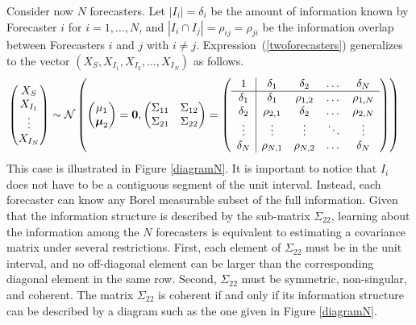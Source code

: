 \documentclass[11pt]{article}
\theoremstyle{definition}
\theoremstyle{definition}
\begin{document}
Consider now $N$ forecasters. Let $|I_i| = \delta_i$ be the amount of 
information known by Forecaster $i$ for $i = 1, \dots, N$, and 
$|I_i \cap I_j| = \rho_{ij} = \rho_{ji}$ be the information overlap 
between Forecasters $i$ and $j$ with $i \neq j$. 
Expression~(\ref{twoforecasters}) generalizes to the vector 
$\left(X_{S}, X_{I_1}, X_{I_2}, \dots, X_{I_N}\right)$ as follows.
\begin{align}
\left(\begin{matrix} X_S \\ X_{I_1}\\ \vdots \\ X_{I_N} \end{matrix}\right) &\sim \mathcal{N}\left( \left(\begin{matrix} 
\mu_1 \\ \boldsymbol{\mu}_2
 \end{matrix}\right) =
 \boldsymbol{0}, \left(\begin{matrix} 
\Sigma_{11} & \Sigma_{12}\\
\Sigma_{21} & \Sigma_{22}\\
 \end{matrix}\right) 
 =
 \left(\begin{array}{c | c c cc }
1 & \delta_1 & \delta_2 & \dots & \delta_N  \\ \hline
\delta_1 & \delta_1 &\rho_{1,2} & \dots & \rho_{1,N}   \\ 
\delta_2 & \rho_{2,1} & \delta_2 & \dots & \rho_{2,N}  \\ 
\vdots & \vdots & \vdots & \ddots & \vdots  \\ 
\delta_N & \rho_{N,1} & \rho_{N,2} & \dots & \delta_N\\ 
 \end{array}\right)\right)  \label{Nforecasters}
\end{align}
This case is illustrated in Figure \ref{diagramN}.  It is important 
to notice that $I_i$ does not have to be a contiguous segment of 
the unit interval.  Instead, each forecaster can know any Borel measurable 
subset of the full information.  Given that the information structure 
is described by the sub-matrix $\Sigma_{22}$, learning about the 
information among the $N$ forecasters is equivalent to estimating 
a covariance matrix under several restrictions.  First, each element 
of $\Sigma_{22}$ must be in the unit interval, and no off-diagonal 
element can be larger than the corresponding diagonal element in 
the same row. Second, $\Sigma_{22}$ must be symmetric, non-singular, 
and coherent. The matrix $\Sigma_{22}$ is coherent if and only if 
its information structure can be described by a diagram such as 
the one given in Figure \ref{diagramN}. 
\end{document}
